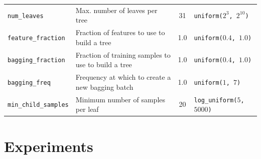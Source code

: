 \documentclass[preprint, 3p, times, twocolumn]{elsarticle}
\begin{document}
\begin{table}
\begin{center}
{\begin{tabular}{l l c l }
  \texttt{num\_leaves} & Max. number of leaves per tree & 31 & \texttt{uniform($2^{3}$, $2^{10}$)} \\  
  \texttt{feature\_fraction} & Fraction of features to use to build a tree & 1.0 & \texttt{uniform($0.4$, $1.0$)} \\  
  \texttt{bagging\_fraction} & Fraction of training samples to use to build a tree & 1.0 & \texttt{uniform($0.4$, $1.0$)} \\  
  \texttt{bagging\_freq} & Frequency at which to create a new bagging batch & 1.0 & \texttt{uniform($1$, $7$)} \\  
  \texttt{min\_child\_samples} & Minimum number of samples per leaf & 20 & \texttt{log\_uniform($5$, $5000$)} \\  
  \bottomrule
  \end{tabular}}
  \end{center}
\end{table}



\section{Experiments} \label{app:experiments}
\end{document}
